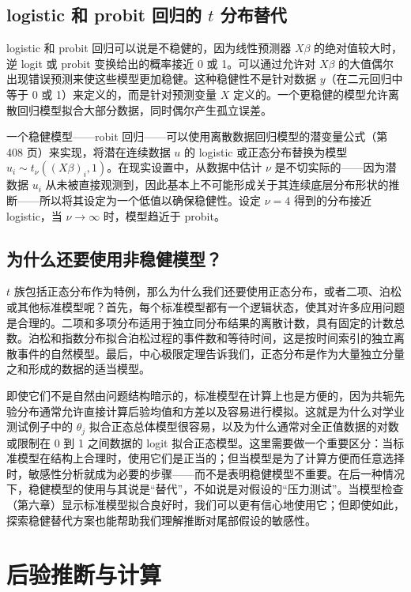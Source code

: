 \subsection{logistic 和 probit 回归的 $t$ 分布替代}

logistic 和 probit 回归可以说是不稳健的，因为线性预测器 $X\beta$ 的绝对值较大时，逆 logit 或 probit 变换给出的概率接近 0 或 1。可以通过允许对 $X\beta$ 的大值偶尔出现错误预测来使这些模型更加稳健。这种稳健性不是针对数据 $y$（在二元回归中等于 0 或 1）来定义的，而是针对预测变量 $X$ 定义的。一个更稳健的模型允许离散回归模型拟合大部分数据，同时偶尔产生孤立误差。

一个稳健模型——robit 回归——可以使用离散数据回归模型的潜变量公式（第 408 页）来实现，将潜在连续数据 $u$ 的 logistic 或正态分布替换为模型 $u_i \sim t_\nu((X\beta)_i, 1)$。在现实设置中，从数据中估计 $\nu$ 是不切实际的——因为潜数据 $u_i$ 从未被直接观测到，因此基本上不可能形成关于其连续底层分布形状的推断——所以将其设定为一个低值以确保稳健性。设定 $\nu = 4$ 得到的分布接近 logistic，当 $\nu \to \infty$ 时，模型趋近于 probit。

\subsection{为什么还要使用非稳健模型？}

$t$ 族包括正态分布作为特例，那么为什么我们还要使用正态分布，或者二项、泊松或其他标准模型呢？首先，每个标准模型都有一个逻辑状态，使其对许多应用问题是合理的。二项和多项分布适用于独立同分布结果的离散计数，具有固定的计数总数。泊松和指数分布拟合泊松过程的事件数和等待时间，这是按时间索引的独立离散事件的自然模型。最后，中心极限定理告诉我们，正态分布是作为大量独立分量之和形成的数据的适当模型。

即使它们不是自然由问题结构暗示的，标准模型在计算上也是方便的，因为共轭先验分布通常允许直接计算后验均值和方差以及容易进行模拟。这就是为什么对学业测试例子中的 $\theta_j$ 拟合正态总体模型很容易，以及为什么通常对全正值数据的对数或限制在 0 到 1 之间数据的 logit 拟合正态模型。这里需要做一个重要区分：当标准模型在结构上合理时，使用它们是正当的；但当模型是为了计算方便而任意选择时，敏感性分析就成为必要的步骤——而不是表明稳健模型不重要。在后一种情况下，稳健模型的使用与其说是``替代''，不如说是对假设的``压力测试''。当模型检查（第六章）显示标准模型拟合良好时，我们可以更有信心地使用它；但即使如此，探索稳健替代方案也能帮助我们理解推断对尾部假设的敏感性。

\section{后验推断与计算}

